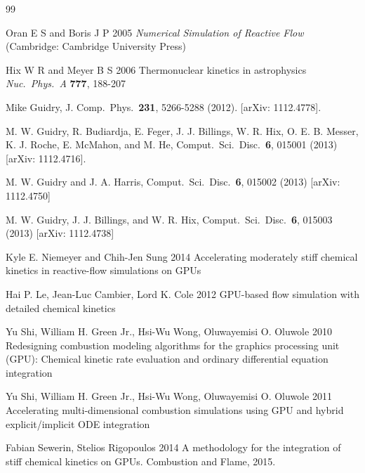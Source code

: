 \documentclass[]{elsart}
\begin{document}

\begin{thebibliography} {99}


Oran E S and Boris J P 2005 {\em Numerical Simulation of
Reactive Flow} (Cambridge: Cambridge University Press)

Hix W R and Meyer B S 2006 Thermonuclear kinetics in astrophysics
{\em Nuc.\ Phys.\ A} {\bf 777}, 188-207

Mike Guidry, J. Comp.\ Phys.\ {\bf 231}, 5266-5288 (2012). [arXiv:
1112.4778].

 M. W. Guidry, R. Budiardja, E. Feger, J. J. Billings, W. R. Hix, O.
E. B. Messer, K. J. Roche, E. McMahon, and M. He, Comput.\ Sci.\ Disc.\ {\bf 6},
015001 (2013) [arXiv: 1112.4716].

 M. W. Guidry and J. A. Harris, Comput.\ Sci.\ Disc.\ {\bf 6},
015002 (2013) [arXiv: 1112.4750]

 M. W. Guidry, J. J. Billings, and W. R. Hix, Comput.\ Sci.\ Disc.\
{\bf 6}, 015003 (2013) [arXiv: 1112.4738]

Kyle E. Niemeyer and Chih-Jen Sung 2014 Accelerating moderately stiff chemical kinetics in reactive-flow simulations on GPUs

Hai P. Le, Jean-Luc Cambier, Lord K. Cole 2012 GPU-based flow simulation with detailed chemical kinetics

Yu Shi, William H. Green Jr., Hsi-Wu Wong, Oluwayemisi O. Oluwole 2010 Redesigning combustion modeling algorithms for the graphics processing unit (GPU): Chemical kinetic rate evaluation and ordinary differential equation integration

Yu Shi, William H. Green Jr., Hsi-Wu Wong, Oluwayemisi O. Oluwole 2011 Accelerating multi-dimensional combustion simulations using GPU and hybrid explicit/implicit ODE integration

Fabian Sewerin, Stelios Rigopoulos 2014 A methodology for the integration of stiff chemical kinetics on GPUs. Combustion and Flame, 2015.


\end{thebibliography}
\end{document}

